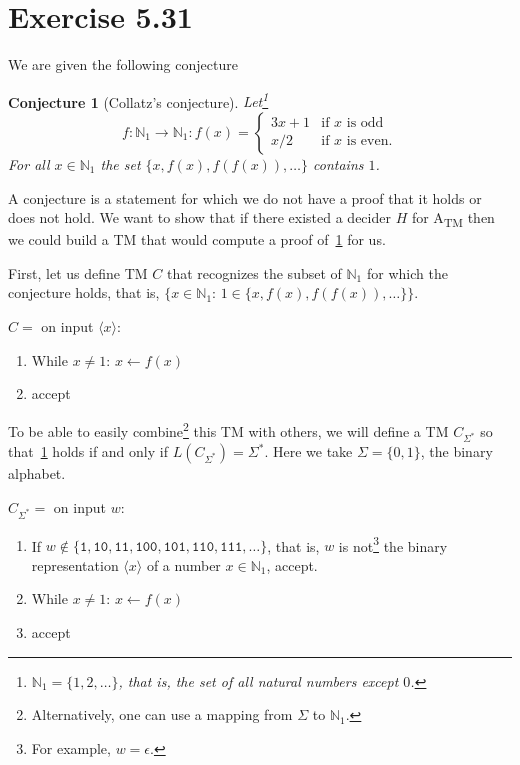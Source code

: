 \documentclass{article}
\newcommand{\conjecturename}{Conjecture}
\newtheorem{conjecture}{\conjecturename}
\newcommand{\st}{\colon\,}
\newcommand{\TM}{TM}
\newcommand{\Atm}{A\textsubscript{TM}}
\newcommand\N{\mathbb{N}_1}
\begin{document}
\section{Exercise 5.31}
We are given the following conjecture
\begin{conjecture}[Collatz's conjecture]\label{collatz}
	Let\footnote{\(\N = \{1,2,\ldots\}\), that is, the set of all natural
		numbers except \(0\).}
\begin{displaymath}
f:\N \to \N:f(x) = \begin{cases}
	3 x + 1 & \text{if \(x\) is odd}\\
	x / 2 & \text{if \(x\) is even}.
\end{cases}
\end{displaymath}
For all \(x \in \N\) the set \(\{x,f(x),f(f(x)),\ldots\}\) contains \(1\).
\end{conjecture}
A conjecture is a statement
for which we do not have a proof that it holds or does not hold.
We want to show that if there existed a decider \(H\) for \Atm{}
then we could build a
\TM{} that would compute a proof of~\ref{collatz} for us.

First, let us define \TM{} \(C\) that recognizes
the subset of \(\N\)
for which the conjecture holds, that is, \(\{x \in \N \st 1 \in
\{x,f(x),f(f(x)),\ldots\} \}\).

\(C =\) on input \(\langle x \rangle\):
\begin{enumerate}
	\item While \(x \neq 1\): \(x \gets f(x)\)
	\item accept
\end{enumerate}

To be able to easily combine\footnote{Alternatively, one can use a mapping from
\(\Sigma\) to \(\N\).} this \TM{} with others, we will define
a \TM{} \(C_{\Sigma^*}\) so that~\ref{collatz} holds if and only if
\(L(C_{\Sigma^*}) =
		\Sigma^*\). Here we take \(\Sigma = \{0,1\}\), the binary alphabet.

		\(C_{\Sigma^*} =\) on input \(w\):
\begin{enumerate}
	\item If \(w \not\in
\{\texttt{1},\texttt{10},\texttt{11},\texttt{100},\texttt{101},\texttt{110},\texttt{111},\ldots\}\),
that is, \(w\) is not\footnote{For example, \(w
	= \epsilon\).} the binary representation \(\langle x \rangle\)
		of a number \(x \in \N\), accept.
	\item While \(x \neq 1\): \(x \gets f(x)\)
	\item accept
\end{enumerate}
\end{document}

